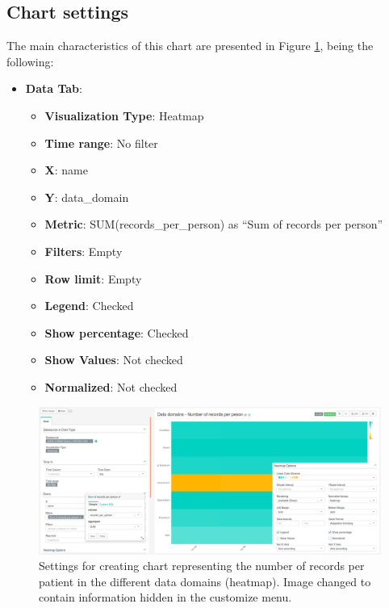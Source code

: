 \documentclass[]{book}
\providecommand{\tightlist}{%
  \setlength{\itemsep}{0pt}\setlength{\parskip}{0pt}}
\begin{document}
\subsection{Chart settings}\label{chart-settings-17}

The main characteristics of this chart are presented in Figure
\ref{fig:dataDomainsNumberOfRecordsPerPeson}, being the following:

\begin{itemize}
\tightlist
\item
  \textbf{Data Tab}:

  \begin{itemize}
  \tightlist
  \item
    \textbf{Visualization Type}: Heatmap
  \item
    \textbf{Time range}: No filter
  \item
    \textbf{X}: name
  \item
    \textbf{Y}: data\_domain
  \item
    \textbf{Metric}: SUM(records\_per\_person) as ``Sum of records per
    person''
  \item
    \textbf{Filters}: Empty
  \item
    \textbf{Row limit}: Empty
  \item
    \textbf{Legend}: Checked
  \item
    \textbf{Show percentage}: Checked
  \item
    \textbf{Show Values}: Not checked
  \item
    \textbf{Normalized}: Not checked
  \end{itemize}
\end{itemize}

\begin{figure}
\includegraphics[width=1\linewidth]{images/dataDomainsNumberOfRecordsPerPeson} \caption{Settings for creating chart representing the number of records per patient in the different data domains (heatmap). Image changed to contain information hidden in the customize menu.}\label{fig:dataDomainsNumberOfRecordsPerPeson}
\end{figure}


\end{document}
